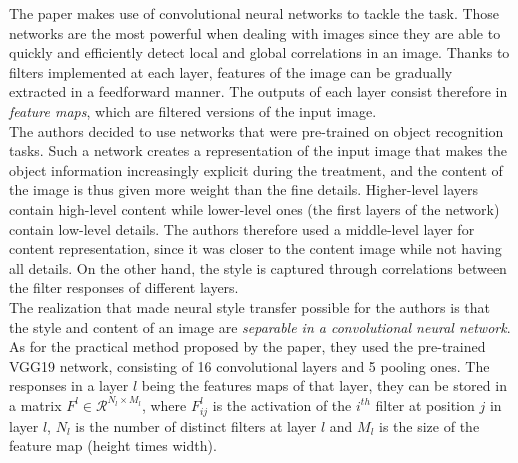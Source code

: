 \documentclass[twocolumn,superscriptaddress,aps,floatfix, nofootinbib]{revtex4-1}
\begin{document}
    The paper \cite{DBLP:journals/corr/GatysEB15a} makes use of convolutional neural networks to tackle the task. Those networks are the most powerful when dealing with images since they are able to quickly and efficiently detect local and global correlations in an image. Thanks to filters implemented at each layer, features of the image can be gradually extracted in a feedforward manner. The outputs of each layer consist therefore in \emph{feature maps}, which are filtered versions of the input image.\\
    
    The authors decided to use networks that were pre-trained on object recognition tasks. Such a network creates a representation of the input image that makes the object information increasingly explicit during the treatment, and the content of the image is thus given more weight than the fine details. Higher-level layers contain high-level content while lower-level ones (the first layers of the network) contain low-level details. The authors therefore used a middle-level layer for content representation, since it was closer to the content image while not having all details. On the other hand, the style is captured through correlations between the filter responses of different layers.\\
    
    The realization that made neural style transfer possible for the authors is that the style and content of an image are \emph{separable in a convolutional neural network}.\\
    
    As for the practical method proposed by the paper, they used the pre-trained VGG19 network, consisting of 16 convolutional layers and 5 pooling ones. The responses in a layer $l$ being the features maps of that layer, they can be stored in a matrix $F^l \in \mathcal{R}^{N_l\times M_l}$, where $F_{ij}^l$ is the activation of the $i^{th}$ filter at position $j$ in layer $l$, $N_l$ is the number of distinct filters at layer $l$ and $M_l$ is the size of the feature map (height times width).\\ 
    
\end{document}
